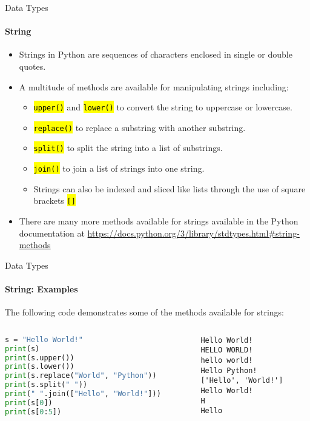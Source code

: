 \documentclass[
    aspectratio=169, 
    usepdftitle=false, 
    xcolor={dvipsnames},
    hyperref={
        colorlinks,
        linkcolor=black,
        urlcolor=blue}
    ]{beamer}
\let\OldTexttt\texttt
\renewcommand{\texttt}[1]{\OldTexttt{\hl{#1}}}%
\begin{document}
\begin{frame}[fragile]{Data Types}
    \framesubtitle{String}
    \begin{itemize}
        \item Strings in Python are sequences of characters enclosed in single or double quotes.
        \item A multitude of methods are available for manipulating strings including:
              \begin{itemize}
                  \item \texttt{upper()} and \texttt{lower()} to convert the string to uppercase or lowercase.
                  \item \texttt{replace()} to replace a substring with another substring.
                  \item \texttt{split()} to split the string into a list of substrings.
                  \item \texttt{join()} to join a list of strings into one string.
                  \item Strings can also be indexed and sliced like lists through the use of square brackets \texttt{[]}
              \end{itemize}
        \item There are many more methods available for strings available in the Python documentation at \url{https://docs.python.org/3/library/stdtypes.html#string-methods}
    \end{itemize}
\end{frame}

\begin{frame}[fragile]{Data Types}
    \framesubtitle{String: Examples}

    The following code demonstrates some of the methods available for strings:

    \begin{columns}
        \begin{column}{0.5\textwidth}

            \begin{lstlisting}[language=Python]
s = "Hello World!"
print(s)
print(s.upper())
print(s.lower())
print(s.replace("World", "Python"))
print(s.split(" "))
print(" ".join(["Hello", "World!"]))
print(s[0])
print(s[0:5])
            \end{lstlisting}

        \end{column}
        \begin{column}{0.4\textwidth}
\begin{lstlisting}[style=output]
Hello World!
HELLO WORLD!
hello world!
Hello Python!
['Hello', 'World!']
Hello World!
H
Hello
            \end{lstlisting}
        \end{column}
    \end{columns}
\end{frame}
\end{document}
